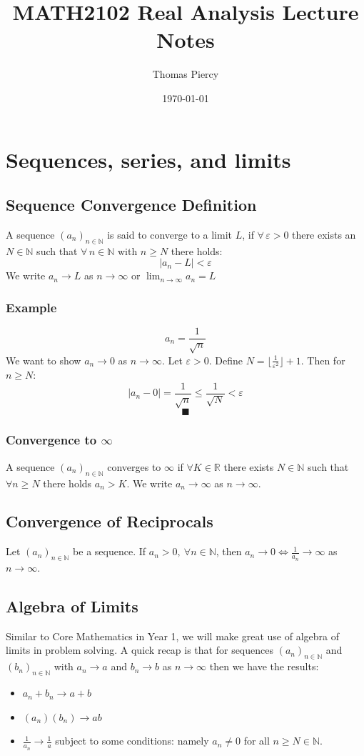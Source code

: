 \documentclass[12pt]{article}
\title{\textbf{MATH2102 Real Analysis Lecture Notes}}
\author{Thomas Piercy}
\date{\today{}}
\newcommand{\seq}[2]{(#1_#2)_{#2\in\mathbb{N}}}
\begin{document}
\maketitle
\hrulefill
\tableofcontents
\newpage
{}
\section{Sequences, series, and limits}
\subsection{Sequence Convergence Definition}
A sequence \(\seq{a}{n}\) is said to converge to a limit \(L\), if \(\forall\,\varepsilon>0\) there exists an \(N\in\mathbb{N}\) such that \(\forall\,n\in\mathbb{N}\) with \(n\geq N\) there holds: 
\[|a_n-L|<\varepsilon\]
We write \(a_n\to L\) as \(n\to \infty\) or \(\lim_{n\to\infty}a_n=L\)
\subsubsection*{Example}
\[a_n=\frac{1}{\sqrt{n}}\]
We want to show \(a_n\to 0\) as \(n\to\infty\). Let \(\varepsilon>0\). Define \(N=\lfloor \frac{1}{\varepsilon^2}\rfloor+1\). Then for \(n\geq N\):
\[|a_n-0|=\frac{1}{\sqrt{n}}\leq\frac{1}{\sqrt{N}}<\varepsilon\]
\[\blacksquare\]
\subsubsection{Convergence to \(\infty\)}
A sequence \(\seq{a}{n}\) converges to \(\infty\) if \(\forall K\in\mathbb{R}\) there exists \(N\in\mathbb{N}\) such that \(\forall n\geq N\) there holds \(a_n>K\). We write \(a_n\to\infty\) as \(n\to\infty\).
\subsection{Convergence of Reciprocals}
Let \(\seq{a}{n}\) be a sequence. If \(a_n>0,\ \forall n\in\mathbb{N}\), then \(a_n\to 0\iff \frac{1}{a_n}\to\infty\) as \(n\to\infty\).
\subsection{Algebra of Limits}
Similar to Core Mathematics in Year 1, we will make great use of algebra of limits in problem solving. A quick recap is that for sequences \(\seq{a}{n}\) and \(\seq{b}{n}\) with \(a_n\to a\) and \(b_n\to b\) as \(n\to \infty\) then we have the results:
\begin{itemize}
    \item \(a_n+b_n\to a+b\)
    \item \((a_n)(b_n)\to ab\)
    \item \(\frac{1}{a_n}\to\frac{1}{a}\) subject to some conditions: namely \(a_n\ne 0\) for all \(n\geq N\in\mathbb{N}\).
\end{itemize}
\end{document}
